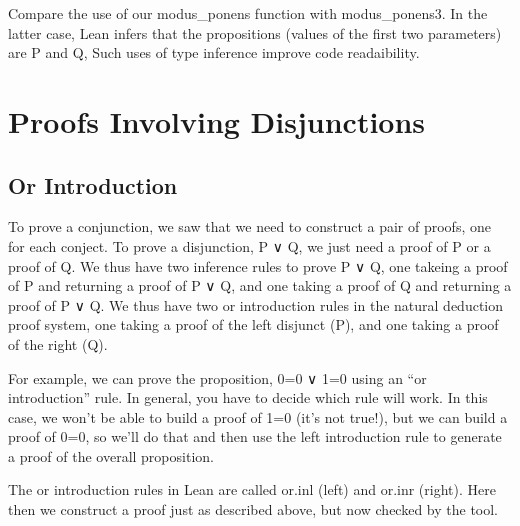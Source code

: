 \documentclass[letterpaper,10pt,english]{sphinxmanual}
\begin{document}
Compare the use of our modus\_ponens function with modus\_ponens3. In
the latter case, Lean infers that the propositions (values of the
first two parameters) are P and Q, Such uses of type inference improve
code readaibility.


\section{Proofs Involving Disjunctions}
\label{\detokenize{15-proofs:proofs-involving-disjunctions}}

\subsection{Or Introduction}
\label{\detokenize{15-proofs:or-introduction}}
To prove a conjunction, we saw that we need to construct a pair of
proofs, one for each conject. To prove a disjunction, P ∨ Q, we just
need a proof of P or a proof of Q. We thus have two inference rules to
prove P ∨ Q, one takeing a proof of P and returning a proof of P ∨ Q,
and one taking a proof of Q and returning a proof of P ∨ Q.  We thus
have two or introduction rules in the natural deduction proof system,
one taking a proof of the left disjunct (P), and one taking a proof of
the right (Q).

For example, we can prove the proposition, 0=0 ∨ 1=0 using an “or
introduction” rule.  In general, you have to decide which rule will
work. In this case, we won’t be able to build a proof of 1=0 (it’s not
true!), but we can build a proof of 0=0, so we’ll do that and then use
the left introduction rule to generate a proof of the overall
proposition.

The or introduction rules in Lean are called or.inl (left) and or.inr
(right).  Here then we construct a proof just as described above, but
now checked by the tool.

\begin{sphinxVerbatim}[commandchars=\\\{\}]
     
     

 
 

     
     
\end{sphinxVerbatim}
\end{document}
